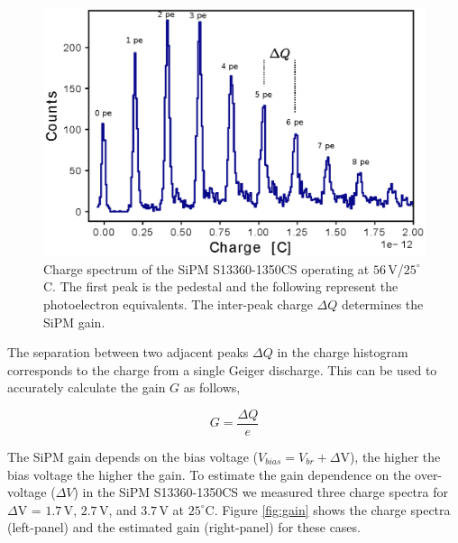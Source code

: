\documentclass[a4paper,11pt]{article}
\begin{document}
\begin{figure}[htbp]
\centering %
\includegraphics[width=.65\textwidth]{Figures/Charge.eps}
\caption{\label{fig:charge} Charge spectrum of the SiPM S13360-1350CS operating at $56$\,V/$25^{\circ}$C. The first peak is the pedestal and the following represent the photoelectron equivalents. The inter-peak charge $\Delta Q$ determines the SiPM gain.}
\end{figure}

The separation between two adjacent peaks $\Delta Q$ in the charge histogram corresponds to the charge from a single Geiger discharge. This can be used to accurately calculate the gain $G$ as follows,

\begin{equation}
\label{eq:gain}
G = \frac{\Delta Q}{e}
\end{equation}

The SiPM gain depends on the bias voltage ($V_{bias} = V_{br} + \Delta$V), the higher the bias voltage the higher the gain. To estimate the gain dependence on the over-voltage ($\Delta V$) in the SiPM S13360-1350CS we measured three charge spectra for $\Delta$V = $1.7$\,V, $2.7$\,V, and $3.7$\,V at $25^{\circ}$C. Figure \ref{fig:gain} shows the charge spectra (left-panel) and the estimated gain (right-panel) for these cases.
\end{document}
